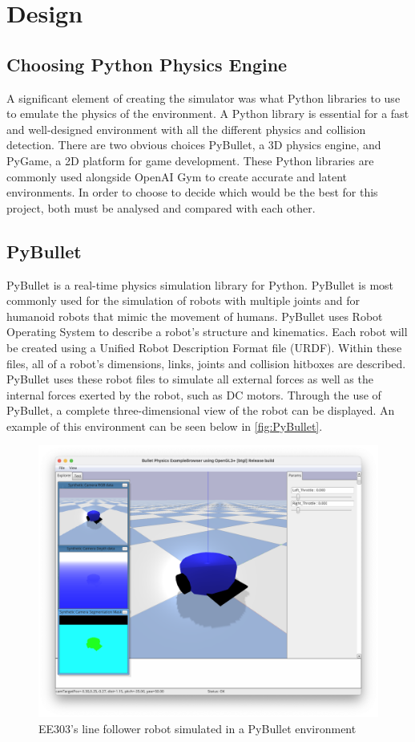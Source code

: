 \documentclass[a4paper,12pt]{article}
\begin{document}
\section{Design}

\subsection{Choosing Python Physics Engine}

A significant element of creating the simulator was what Python libraries to use to emulate the physics of the environment. A Python library is essential for a fast and well-designed environment with all the different physics and collision detection. There are two obvious choices PyBullet, a 3D physics engine, and PyGame, a 2D platform for game development. These Python libraries are commonly used alongside OpenAI Gym to create accurate and latent environments. In order to choose to decide which would be the best for this project, both must be analysed and compared with each other.

\subsection{PyBullet}

PyBullet is a real-time physics simulation library for Python. PyBullet is most commonly used for the simulation of robots with multiple joints and for humanoid robots that mimic the movement of humans. PyBullet uses Robot Operating System to describe a robot's structure and kinematics. Each robot will be created using a Unified Robot Description Format file (URDF). Within these files, all of a robot's dimensions, links, joints and collision hitboxes are described. PyBullet uses these robot files to simulate all external forces as well as the internal forces exerted by the robot, such as DC motors. Through the use of PyBullet, a complete three-dimensional view of the robot can be displayed. An example of this environment can be seen below in \autoref{fig:PyBullet}.

\begin{figure}[h]
\centering
\includegraphics[width=12cm]{./imgs/PyBullet.png}
\caption{EE303's line follower robot simulated in a PyBullet environment}
\label{fig:PyBullet}
\end{figure}
\end{document}
